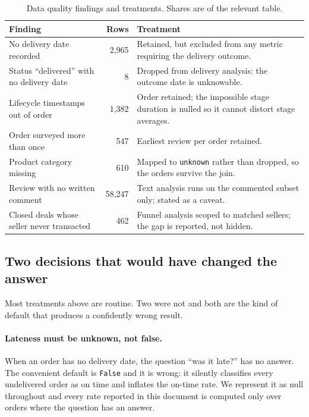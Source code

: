 \documentclass[11pt,a4paper]{article}
\begin{document}
\begin{table}[H]
\centering
\small
\caption{Data quality findings and treatments. Shares are of the relevant table.}
\label{tab:audit}
\begin{tabular}{@{}p{5.6cm}rp{7.4cm}@{}}
\toprule
\textbf{Finding} & \textbf{Rows} & \textbf{Treatment}\\
\midrule
No delivery date recorded & 2{,}965 & Retained, but excluded from any metric
requiring the delivery outcome.\\
Status ``delivered'' with no delivery date & 8 & Dropped from delivery analysis:
the outcome date is unknowable.\\
Lifecycle timestamps out of order & 1{,}382 & Order retained; the impossible stage
duration is nulled so it cannot distort stage averages.\\
Order surveyed more than once & 547 & Earliest review per order retained.\\
Product category missing & 610 & Mapped to \texttt{unknown} rather than dropped,
so the orders survive the join.\\
Review with no written comment & 58{,}247 & Text analysis runs on the commented
subset only; stated as a caveat.\\
Closed deals whose seller never transacted & 462 & Funnel analysis scoped to
matched sellers; the gap is reported, not hidden.\\
\bottomrule
\end{tabular}
\end{table}

\subsection{Two decisions that would have changed the answer}

Most treatments above are routine. Two were not and both are the kind of default
that produces a confidently wrong result.

\paragraph{Lateness must be unknown, not false.} When an order has no delivery
date, the question ``was it late?'' has no answer. The convenient default is
\texttt{False} and it is wrong: it silently classifies every undelivered order as
on time and inflates the on-time rate. We represent it as null throughout and
every rate reported in this document is computed only over orders where the
question has an answer.
\end{document}
